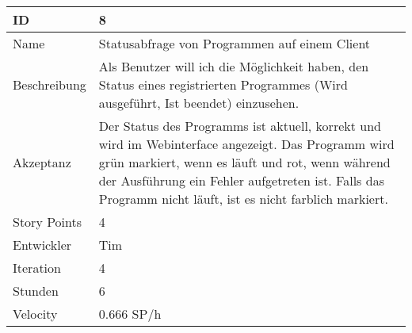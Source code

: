 \begin{table}[htbp]
    \begin{minipage}{\linewidth}
        \setlength{\tymax}{0.5\linewidth}
        \centering
        \small
        \begin{tabulary}{\textwidth}{|l|p{10cm}|} \hline
            ID   &8\\\hline
            Name  &Statusabfrage von Programmen auf einem Client\\\hline
	    Beschreibung&Als Benutzer will ich die Möglichkeit haben, den Status eines registrierten Programmes (Wird ausgeführt, Ist beendet) einzusehen.\\\hline
	    Akzeptanz &Der Status des Programms ist aktuell, korrekt und wird im Webinterface angezeigt. Das Programm wird grün markiert, wenn es läuft und rot, wenn während der Ausführung ein Fehler aufgetreten ist. Falls das Programm nicht läuft, ist es nicht farblich markiert.\\\hline
            Story Points&4\\\hline
            Entwickler &Tim\\\hline
            Iteration &4\\\hline
            Stunden  &6\\\hline
            Velocity &0.666 SP\slash h\\\hline
        \end{tabulary}
    \end{minipage}
\end{table}



